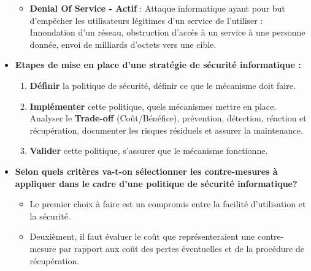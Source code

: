\documentclass{report}
\begin{document}
\begin{itemize}
\begin{itemize}
						\item \textbf{Denial Of Service - Actif} : Attaque informatique ayant pour but d'empêcher les utilisateurs légitimes d'un service de l'utiliser : Innondation d'un réseau, obstruction d'accès à un service à une personne donnée, envoi de milliards d'octets vers une cible.\\

					\end{itemize}

				\item \textbf{Etapes de mise en place d'une stratégie de sécurité informatique :}\\

					\begin{enumerate}

						\item \textbf{Définir} la politique de sécurité, définir ce que le mécanisme doit faire.\\
						\item \textbf{Implémenter} cette politique, quels mécanismes mettre en place.\\
						Analyser le \textbf{Trade-off} (Coût/Bénéfice), prévention, détection, réaction et récupération, documenter les risques résiduels et assurer la maintenance.\\
						\item \textbf{Valider} cette politique, s'assurer que le mécanisme fonctionne.\\

					\end{enumerate}

				\item \textbf{Selon quels critères va-t-on sélectionner les contre-mesures à appliquer dans le cadre d'une politique de sécurité informatique?}\\

					\begin{itemize}
						\item Le premier choix à faire est un compromis entre la facilité d'utilisation et la sécurité.\\
						\item Deuxièment, il faut évaluer le coût que représenteraient une contre-mesure par rapport aux coût des pertes éventuelles et de la procédure de récupération.\\
					\end{itemize}

			\end{itemize}
\end{document}
